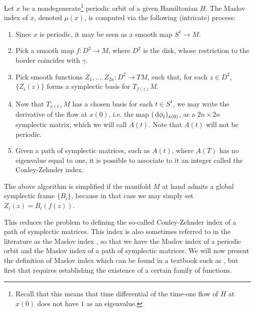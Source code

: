 Let $x$ be a nondegenerate\footnote{Recall that this means that time differential of the time-one flow of $H$ at $x(0)$ does not have $1$ as an eigenvalue.} periodic orbit of a given Hamiltonian $H$. The Maslov index of $x$, denoted $\mu(x)$, is computed via the following (intricate) process:
\begin{algorithm}\label{alg:maslovalg}
\begin{enumerate}[algorithm]
\item\label{maslovalg:step1} Since $x$ is periodic, it may be seen as a smooth map $S^1 \to M$.
\item\label{maslovalg:step2} Pick a smooth map $f \colon D^2 \to M$, where $D^2$ is the disk, whose restriction to the border coincides with $\gamma$.
\item\label{maslovalg:step3} Pick smooth functions $Z_1, \dots, Z_{2n} \colon D^2 \to TM$, such that, for each $z \in D^2$, $\{Z_i(z)\}$ forms a symplectic basis for $T_{f(z)} M$.
\item\label{maslovalg:step4} Now that $T_{x(t)} M$ has a chosen basis for each $t \in S^1$, we may write the derivative of the flow at $x(0)$, i.e. the map $(\dl \phi_t)_{x(0)}$, as a $2n \times 2n$ symplectic matrix, which we will call $A(t)$. Note that $A(t)$ will not be periodic.
\item\label{maslovalg:step5} Given a path of symplectic matrices, such as $A(t)$, where $A(T)$ has no eigenvalue equal to one, it is possible to associate to it an integer called the Conley-Zehnder index.
\end{enumerate}
\end{algorithm}

\begin{remark}
The above algorithm is simplified if the manifold $M$ at hand admits a global symplectic frame $\{B_i\}$, because in that case we may simply set $Z_i(z) = B_i(f(z))$.
\end{remark}

This reduces the problem to defining the so-called Conley-Zehnder index of a path of symplectic matrices. This index is also sometimes referred to in the literature as the Maslov index \cite{audin}, so that we have the Maslov index of a periodic orbit and the Maslov index of a path of symplectic matrices. We will now present the definition of Maslov index which can be found in a textbook such as \cite{audin}, but first that requires establishing the existence of a certain family of functions.

